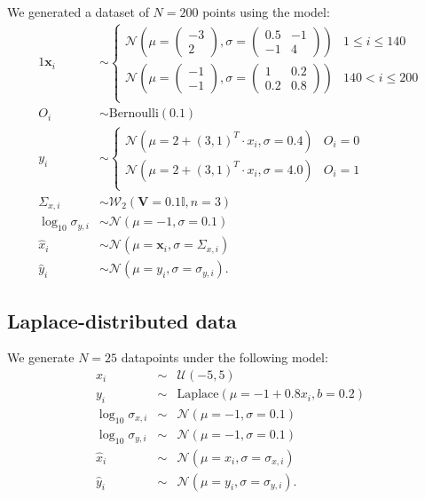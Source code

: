 \documentclass[fleqn,usenatbib]{mnras}
\begin{document}
We generated a dataset of $N = 200$ points using the model:
\begin{alignat}{1}
    \boldsymbol{x}_i& \sim
    \begin{cases}
        \mathcal N \left(
            \mu = \begin{pmatrix} -3 \\ 2 \end{pmatrix},
            \sigma = \begin{pmatrix} 0.5 & -1 \\ -1 & 4 \end{pmatrix}
        \right) &
            1 \leqslant i \leqslant 140 \\
        \mathcal N \left(
            \mu = \begin{pmatrix} -1 \\ -1 \end{pmatrix},
            \sigma = \begin{pmatrix} 1 & 0.2 \\ 0.2 & 0.8 \end{pmatrix}
        \right) &
            140 < i \leqslant 200 \\
    \end{cases}\\
    O_i& \sim \mathrm{Bernoulli}(0.1) \\
    y_i& \sim
    \begin{cases}
        \mathcal N (\mu = 2 + (3, 1)^T \cdot x_i, \sigma = 0.4) &
            O_i = 0 \\
        \mathcal N (\mu = 2 + (3, 1)^T \cdot x_i, \sigma = 4.0) &
            O_i = 1 \\
    \end{cases}\\
    \Sigma_{x, i}& \sim \mathcal W_2 (\boldsymbol{V} = 0.1 \mathbb{I}, n = 3) \\
    \log_{10} \sigma_{y, i}& \sim \mathcal N (\mu = -1, \sigma = 0.1) \\
    \hat{x}_i& \sim \mathcal N (\mu = \boldsymbol{x}_i, \sigma = \Sigma_{x, i}) \\
    \hat{y}_i& \sim \mathcal N (\mu = y_i, \sigma = \sigma_{y, i}).
\end{alignat}

\subsection{Laplace-distributed data}
\label{sec:data-models.laplace}

We generate $N = 25$ datapoints under the following model:
\begin{eqnarray}
    x_i &\sim& \mathcal U (-5, 5) \\
    y_i &\sim& \mathrm{Laplace} (\mu = -1 + 0.8 x_i, b = 0.2) \\
    \log_{10} \sigma_{x, i} &\sim& \mathcal N (\mu = -1, \sigma = 0.1) \\
    \log_{10} \sigma_{y, i} &\sim& \mathcal N (\mu = -1, \sigma = 0.1) \\
    \hat{x}_i &\sim& \mathcal N (\mu = x_i, \sigma = \sigma_{x, i}) \\
    \hat{y}_i &\sim& \mathcal N (\mu = y_i, \sigma = \sigma_{y, i}).
\end{eqnarray}
\end{document}
